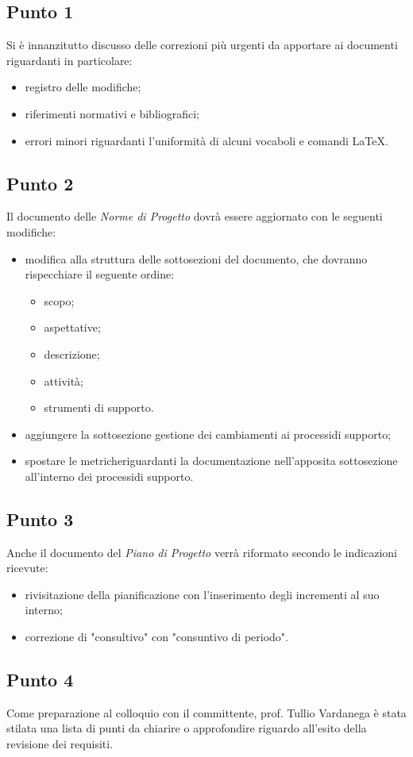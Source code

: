     \subsection{Punto 1}
        Si è innanzitutto discusso delle correzioni più urgenti da apportare ai documenti riguardanti in particolare:
        \begin{itemize}
            \item registro delle modifiche;
            \item riferimenti normativi e bibliografici;
            \item errori minori riguardanti l'uniformità di alcuni vocaboli e comandi \LaTeX.
        \end{itemize}
    \subsection{Punto 2}
        Il documento delle \textit{Norme di Progetto} dovrà essere aggiornato con le seguenti modifiche:
        \begin{itemize}
            \item modifica alla struttura delle sottosezioni del documento, che dovranno rispecchiare il seguente ordine:
            \begin{itemize}
                \item scopo;
                \item aspettative;
                \item descrizione;
                \item attività;
                \item strumenti di supporto.
            \end{itemize}
            \item aggiungere la sottosezione gestione dei cambiamenti ai processi\glosp di supporto;
            \item spostare le metriche\glosp riguardanti la documentazione nell'apposita sottosezione all'interno dei processi\glosp di supporto.
        \end{itemize} 
    \subsection{Punto 3}
        Anche il documento del \textit{Piano di Progetto} verrà riformato secondo le indicazioni ricevute:
        \begin{itemize}
            \item rivisitazione della pianificazione con l'inserimento degli incrementi al suo interno;
            \item correzione di "consultivo" con "consuntivo di periodo".
        \end{itemize}
    \subsection{Punto 4}
        Come preparazione al colloquio con il committente, prof. Tullio Vardanega è stata stilata una lista di punti da chiarire o approfondire riguardo all'esito della revisione dei requisiti.
